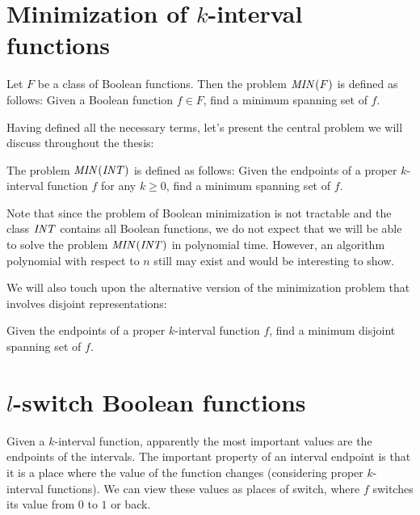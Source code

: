 \section{Minimization of \texorpdfstring{$k$}{k}-interval functions}

\begin{problem}
\label{problem:minimization}
Let $F$ be a class of Boolean functions.
Then the problem $\mathit{MIN} (F)$ is defined as follows:
Given a Boolean function $f \in F$,
find a minimum spanning set of $f$.
\end{problem}

Having defined all the necessary terms,
let's present the central problem
we will discuss throughout the thesis:
\begin{problem}
\label{problem:allintervalfnsminimization}
The problem $\mathit{MIN} (\mathit{INT})$ is defined as follows:
Given the endpoints
of a proper $k$-interval function $f$ for any $k \geq 0$,
find a minimum spanning set of $f$.
\end{problem}

Note that since the problem of Boolean minimization is not tractable \citep{Umans1998}
and the class $\mathit{INT}$ contains all Boolean functions,
we do not expect that we will be able to solve the problem $\mathit{MIN} (\mathit{INT})$ in polynomial time.
However,
an algorithm polynomial with respect to $n$ still may exist and would be interesting to show.

We will also touch upon the alternative version
of the minimization problem
that involves disjoint representations:
\begin{problem}
Given the endpoints
of a proper $k$-interval function $f$,
find a minimum disjoint spanning set of $f$.
\end{problem}

\section{\texorpdfstring{$l$}{l}-switch Boolean functions}

Given a $k$-interval function,
apparently the most important values are the endpoints of the intervals.
The important property of an interval endpoint is that
it is a place where the value of the function changes
(considering proper $k$-interval functions).
We can view these values as places of switch,
where $f$ switches its value from $0$ to $1$ or back.

